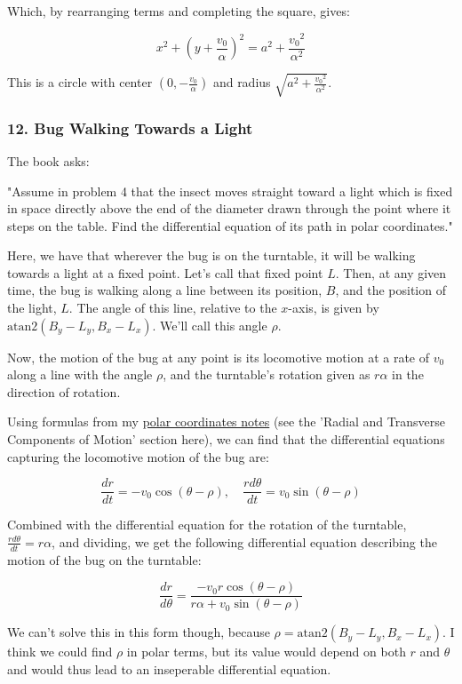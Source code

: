 \documentclass{article}
\begin{document}
Which, by rearranging terms and completing the square, gives:

\[ x^2 + (y + \frac{v_0}{\alpha})^2 = a^2 + \frac{ {v_0}^2 }{\alpha^2} \tag{5.j} \]

This is a circle with center $(0, -\frac{v_0}{\alpha})$ and radius $\sqrt{a^2 + \frac{ {v_0}^2 }{\alpha^2}}$.

\subsubsection{12. Bug Walking Towards a Light}

The book asks:

"Assume in problem 4 that the insect moves straight toward a light which is fixed in space directly above the end of the diameter drawn through the point where it steps on the table. Find the differential equation of its path in polar coordinates."

Here, we have that wherever the bug is on the turntable, it will be walking towards a light at a fixed point. Let's call that fixed point $L$. Then, at any given time, the bug is walking along a line between its position, $B$, and the position of the light, $L$. The angle of this line, relative to the $x$-axis, is given by $\text{atan2}(B_y - L_y, B_x - L_x)$. We'll call this angle $\rho$.

Now, the motion of the bug at any point is its locomotive motion at a rate of $v_0$ along a line with the angle $\rho$, and the turntable's rotation given as $r\alpha$ in the direction of rotation.
  
Using formulas from my \href{https://jhobbs.github.io/mathnotes/calculus/polar-coordinates.html}{polar coordinates notes} (see the 'Radial and Transverse Components of Motion' section here), we can find that the differential equations capturing the locomotive motion of the bug are:

\[ \frac{dr}{dt} = -v_0 \cos{(\theta - \rho)},\quad \frac{rd\theta}{dt} = v_0\sin{(\theta - \rho)} \tag{12.a} \]

Combined with the differential equation for the rotation of the turntable, $\frac{rd\theta}{dt} = r\alpha$, and dividing, we get the following differential equation describing the motion of the bug on the turntable:

\[ \frac{dr}{d\theta} = \frac{-v_0 r \cos{(\theta - \rho)}}{r \alpha + v_0 \sin{(\theta - \rho)}} \tag{12.b} \] 

We can't solve this in this form though, because $\rho = \text{atan2}(B_y - L_y, B_x - L_x)$. I think we could find $\rho$ in polar terms, but its value would depend on both $r$ and $\theta$ and would thus lead to an inseperable differential equation.
\end{document}
